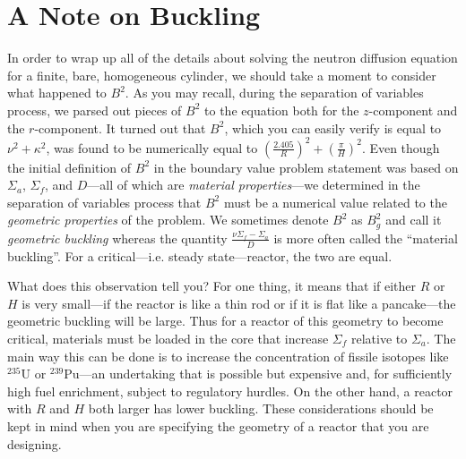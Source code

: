 \section{A Note on Buckling}
In order to wrap up all of the details about solving the neutron diffusion equation for a finite, bare, homogeneous cylinder, we should take a moment to consider what happened to $B^2$.  As you may recall, during the separation of variables process, we parsed out pieces of $B^2$ to the equation both for the $z$-component and the $r$-component.  It turned out that $B^2$, which you can easily verify is equal to $\nu^2 + \kappa^2$, was found to be numerically equal to $\left(\frac{2.405}{R} \right)^2 + \left(\frac{\pi}{H} \right)^2$.  Even though the initial definition of $B^2$ in the boundary value problem statement was based on $\Sigma_a$, $\Sigma_f$, and $D$---all of which are \emph{material properties}---we determined in the separation of variables process that $B^2$ must be a numerical value related to the \emph{geometric properties} of the problem.  We sometimes denote $B^2$ as $B_g^2$ and call it \emph{geometric buckling} whereas the quantity $\frac{\nu \Sigma_f - \Sigma_a}{D}$ is more often called the ``material buckling''.  For a critical---i.e. steady state---reactor, the two are equal. 

What does this observation tell you?  For one thing, it means that if either $R$ or $H$ is very small---if the reactor is like a thin rod or if it is flat like a pancake---the geometric buckling will be large.  Thus for a reactor of this geometry to become critical, materials must be loaded in the core that increase $\Sigma_f$ relative to $\Sigma_a$.  The main way this can be done is to increase the concentration of fissile isotopes like $^{235}\text{U}$ or $^{239}\text{Pu}$---an undertaking that is possible but expensive and, for sufficiently high fuel enrichment, subject to regulatory hurdles.  On the other hand, a reactor with $R$ and $H$ both larger has lower buckling. These considerations should be kept in mind when you are specifying the geometry of a reactor that you are designing.





